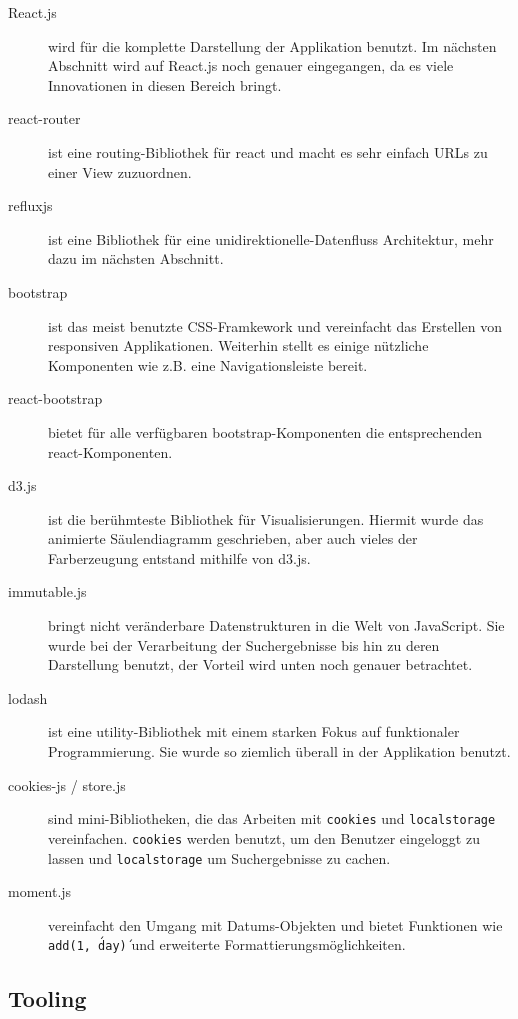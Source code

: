 \documentclass[12pt,twoside]{book}
\begin{document}
\begin{description}
	\item[React.js \cite{react}] wird für die komplette Darstellung der Applikation benutzt. Im nächsten Abschnitt wird auf React.js noch genauer eingegangen, da es viele Innovationen in diesen Bereich bringt.
	\item[react-router \cite{reactrouter}] ist eine routing-Bibliothek für react und macht es sehr einfach URLs zu einer View zuzuordnen.
	\item[refluxjs \cite{reflux}] ist eine Bibliothek für eine unidirektionelle-Datenfluss Architektur, mehr dazu im nächsten Abschnitt.
	\item[bootstrap \cite{bootstrap}] ist das meist benutzte CSS-Framkework und vereinfacht das Erstellen von responsiven Applikationen. Weiterhin stellt es einige nützliche Komponenten wie z.B. eine Navigationsleiste bereit.
	\item[react-bootstrap \cite{reactrouter}] bietet für alle verfügbaren bootstrap-Komponenten die entsprechenden react-Komponenten.
	\item[d3.js \cite{bostock2011d3}] ist die berühmteste Bibliothek für Visualisierungen. Hiermit wurde das animierte Säulendiagramm geschrieben, aber auch vieles der Farberzeugung entstand mithilfe von d3.js.
	\item[immutable.js \cite{Immutable}] bringt nicht veränderbare Datenstrukturen in die Welt von JavaScript. Sie wurde bei der Verarbeitung der Suchergebnisse bis hin zu deren Darstellung benutzt, der Vorteil wird unten noch genauer betrachtet.
	\item[lodash \cite{lodash}] ist eine utility-Bibliothek mit einem starken Fokus auf funktionaler Programmierung. Sie wurde so ziemlich überall in der Applikation benutzt.
	\item[cookies-js \cite{cookiesjs} / store.js \cite{storejs}]sind mini-Bibliotheken, die das Arbeiten mit \texttt{cookies} und \texttt{localstorage} vereinfachen. \texttt{cookies} werden benutzt, um den Benutzer eingeloggt zu lassen und \texttt{localstorage} um Suchergebnisse zu cachen.
	\item[moment.js \cite{momentjs}] vereinfacht den Umgang mit Datums-Objekten und bietet Funktionen wie \texttt{add(1, \'day\')} und erweiterte Formattierungsmöglichkeiten.
\end{description}

\subsection{Tooling}
\end{document}
